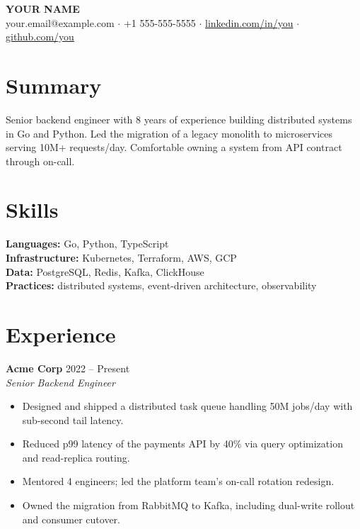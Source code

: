 \documentclass[11pt,a4paper]{article}
\begin{document}
\begin{center}
{\LARGE \textbf{YOUR NAME}} \\
your.email@example.com $\cdot$ +1 555-555-5555 $\cdot$ \href{https://www.linkedin.com/in/you}{linkedin.com/in/you} $\cdot$ \href{https://github.com/you}{github.com/you}
\end{center}

\section*{Summary}
Senior backend engineer with 8 years of experience building distributed systems
in Go and Python. Led the migration of a legacy monolith to microservices
serving 10M+ requests/day. Comfortable owning a system from API contract
through on-call.

\section*{Skills}
\textbf{Languages:} Go, Python, TypeScript \\
\textbf{Infrastructure:} Kubernetes, Terraform, AWS, GCP \\
\textbf{Data:} PostgreSQL, Redis, Kafka, ClickHouse \\
\textbf{Practices:} distributed systems, event-driven architecture, observability

\section*{Experience}

\textbf{Acme Corp} \hfill 2022 -- Present \\
\textit{Senior Backend Engineer}
\begin{itemize}
  \item Designed and shipped a distributed task queue handling 50M jobs/day with sub-second tail latency.
  \item Reduced p99 latency of the payments API by 40\% via query optimization and read-replica routing.
  \item Mentored 4 engineers; led the platform team's on-call rotation redesign.
  \item Owned the migration from RabbitMQ to Kafka, including dual-write rollout and consumer cutover.
\end{itemize}
\end{document}
